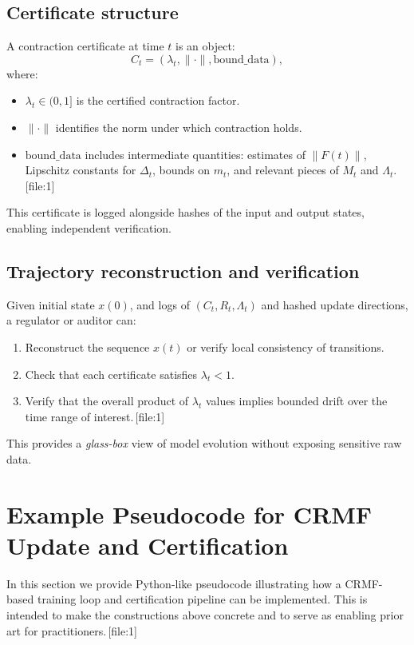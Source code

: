 \documentclass[11pt]{article}
\begin{document}
\subsection{Certificate structure}

A contraction certificate at time $t$ is an object:
\[
  C_t = (\lambda_t, \|\cdot\|, \text{bound\_data}),
\]
where:
\begin{itemize}[leftmargin=1.5em]
  \item $\lambda_t \in (0,1]$ is the certified contraction factor.
  \item $\|\cdot\|$ identifies the norm under which contraction holds.
  \item $\text{bound\_data}$ includes intermediate quantities: estimates of $\|F(t)\|$, Lipschitz constants for $\Delta_t$, bounds on $m_t$, and relevant pieces of $M_t$ and $\Lambda_t$.\,[file:1]
\end{itemize}
This certificate is logged alongside hashes of the input and output states, enabling independent verification.

\subsection{Trajectory reconstruction and verification}

Given initial state $x(0)$, and logs of $(C_t, R_t, \Lambda_t)$ and hashed update directions, a regulator or auditor can:
\begin{enumerate}[leftmargin=1.5em]
  \item Reconstruct the sequence $x(t)$ or verify local consistency of transitions.
  \item Check that each certificate satisfies $\lambda_t < 1$.
  \item Verify that the overall product of $\lambda_t$ values implies bounded drift over the time range of interest.\,[file:1]
\end{enumerate}
This provides a \emph{glass-box} view of model evolution without exposing sensitive raw data.

\section{Example Pseudocode for CRMF Update and Certification}

In this section we provide Python-like pseudocode illustrating how a CRMF-based training loop and certification pipeline can be implemented.
This is intended to make the constructions above concrete and to serve as enabling prior art for practitioners.\,[file:1]
\end{document}
